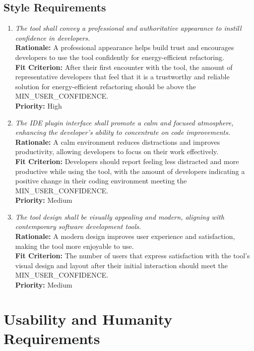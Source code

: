 \documentclass[12pt]{article}
\begin{document}
\subsection{Style Requirements}
\begin{enumerate}[label=LFR-ST \arabic*., wide=0pt, leftmargin=*]
  \item \emph{The tool shall convey a professional and authoritative
    appearance to instill confidence in developers.}\\[2mm]
    {\bf Rationale:} A professional appearance helps build trust and
    encourages developers to use the tool confidently for
    energy-efficient refactoring.\\
    {\bf Fit Criterion:} After their first encounter with the tool,
    the amount of representative developers that feel that it is a
    trustworthy and reliable solution for energy-efficient
    refactoring should be above the MIN\_USER\_CONFIDENCE.\\
    {\bf Priority:} High
  \item \emph{The IDE plugin interface shall promote a calm and
      focused atmosphere, enhancing the developer's ability to
    concentrate on code improvements.}\\[2mm]
    {\bf Rationale:} A calm environment reduces distractions and
    improves productivity, allowing developers to focus on their work
    effectively.\\
    {\bf Fit Criterion:} Developers should report feeling less
    distracted and more productive while using the tool, with the
    amount of developers indicating a positive change in their coding
    environment meeting the MIN\_USER\_CONFIDENCE.\\
    {\bf Priority:} Medium
  \item \emph{The tool design shall be visually appealing and modern,
    aligning with contemporary software development tools.}\\[2mm]
    {\bf Rationale:} A modern design improves user experience and
    satisfaction, making the tool more enjoyable to use.\\
    {\bf Fit Criterion:} The number of users that express
    satisfaction with the tool's visual design and layout after their
    initial interaction should meet the MIN\_USER\_CONFIDENCE.\\
    {\bf Priority:} Medium
\end{enumerate}

\section{Usability and Humanity Requirements}
\end{document}
